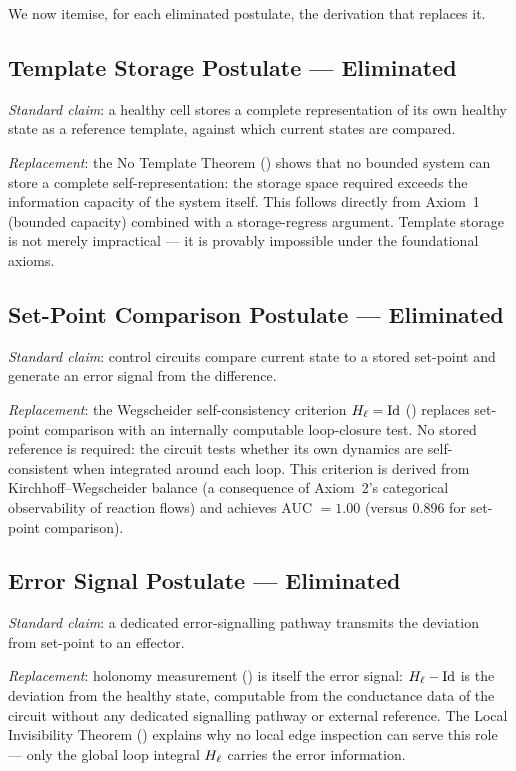 We now itemise, for each eliminated postulate, the derivation that replaces it.

\subsection{Template Storage Postulate — Eliminated}

\emph{Standard claim}: a healthy cell stores a complete representation of its
own healthy state as a reference template, against which current states are
compared.

\emph{Replacement}: the No Template Theorem () shows
that no bounded system can store a complete self-representation: the storage
space required exceeds the information capacity of the system itself.  This
follows directly from Axiom~1 (bounded capacity) combined with a
storage-regress argument.  Template storage is not merely impractical — it
is provably impossible under the foundational axioms.

\subsection{Set-Point Comparison Postulate — Eliminated}

\emph{Standard claim}: control circuits compare current state to a stored
set-point and generate an error signal from the difference.

\emph{Replacement}: the Wegscheider self-consistency criterion $H_\ell = \mathrm{Id}$
() replaces set-point comparison with an
internally computable loop-closure test.  No stored reference is required:
the circuit tests whether its own dynamics are self-consistent when integrated
around each loop.  This criterion is derived from Kirchhoff--Wegscheider
balance (a consequence of Axiom~2's categorical observability of reaction flows)
and achieves AUC $= 1.00$ (versus $0.896$ for set-point comparison).

\subsection{Error Signal Postulate — Eliminated}

\emph{Standard claim}: a dedicated error-signalling pathway transmits the
deviation from set-point to an effector.

\emph{Replacement}: holonomy measurement () is itself
the error signal: $H_\ell - \mathrm{Id}$ is the deviation from the healthy
state, computable from the conductance data of the circuit without any
dedicated signalling pathway or external reference.  The Local Invisibility
Theorem () explains why no local edge inspection can
serve this role — only the global loop integral $H_\ell$ carries the error
information.

